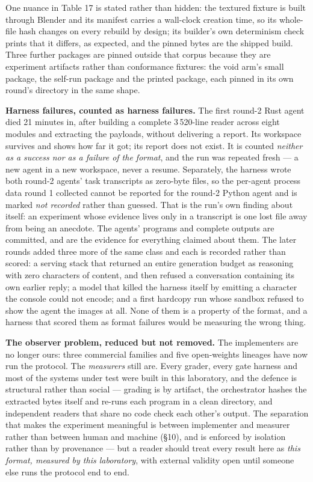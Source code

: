 \documentclass[10pt,twocolumn,letterpaper]{article}
\begin{document}
One nuance in Table 17 is stated rather than hidden: the textured fixture is built through Blender and its manifest carries a wall-clock creation time, so its whole-file hash changes on every rebuild by design; its builder's own determinism check prints that it differs, as expected, and the pinned bytes are the shipped build. Three further packages are pinned outside that corpus because they are experiment artifacts rather than conformance fixtures: the void arm's small package, the self-run package and the printed package, each pinned in its own round's directory in the same shape.

\textbf{Harness failures, counted as harness failures.} The first round-2 Rust agent died 21 minutes in, after building a complete 3\,520-line reader across eight modules and extracting the payloads, without delivering a report. Its workspace survives and shows how far it got; its report does not exist. It is counted \emph{neither as a success nor as a failure of the format}, and the run was repeated fresh --- a new agent in a new workspace, never a resume. Separately, the harness wrote both round-2 agents' task transcripts as zero-byte files, so the per-agent process data round 1 collected cannot be reported for the round-2 Python agent and is marked \emph{not recorded} rather than guessed. That is the run's own finding about itself: an experiment whose evidence lives only in a transcript is one lost file away from being an anecdote. The agents' programs and complete outputs are committed, and are the evidence for everything claimed about them. The later rounds added three more of the same class and each is recorded rather than scored: a serving stack that returned an entire generation budget as reasoning with zero characters of content, and then refused a conversation containing its own earlier reply; a model that killed the harness itself by emitting a character the console could not encode; and a first hardcopy run whose sandbox refused to show the agent the images at all. None of them is a property of the format, and a harness that scored them as format failures would be measuring the wrong thing.

\textbf{The observer problem, reduced but not removed.} The implementers are no longer ours: three commercial families and five open-weights lineages have now run the protocol. The \emph{measurers} still are. Every grader, every gate harness and most of the systems under test were built in this laboratory, and the defence is structural rather than social --- grading is by artifact, the orchestrator hashes the extracted bytes itself and re-runs each program in a clean directory, and independent readers that share no code check each other's output. The separation that makes the experiment meaningful is between implementer and measurer rather than between human and machine (\S10), and is enforced by isolation rather than by provenance --- but a reader should treat every result here as \emph{this format, measured by this laboratory}, with external validity open until someone else runs the protocol end to end.
\end{document}
